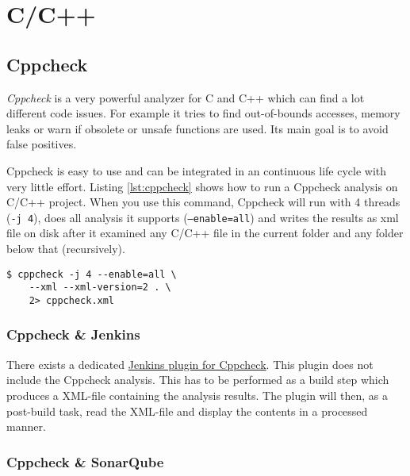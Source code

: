\section{C/C++}

\subsection{Cppcheck}
\textit{Cppcheck} is a very powerful analyzer for C and C++ which can find a lot different code issues. For example it tries to find out-of-bounds accesses, memory leaks or warn if obsolete or unsafe functions are used. Its main goal is to avoid false positives.

Cppcheck is easy to use and can be integrated in an continuous life cycle with very little effort.
Listing \ref{lst:cppcheck} shows how to run a Cppcheck analysis on C/C++ project. When you use this command, Cppcheck will run with 4 threads (\texttt{-j 4}), does all analysis it supports (\texttt{--enable=all}) and writes the results as xml file on disk after it examined any C/C++ file in the current folder and any folder below that (recursively).

\begin{lstlisting}[caption={Bash command to run Cppcheck},label={lst:cppcheck}]
$ cppcheck -j 4 --enable=all \
	--xml --xml-version=2 . \
	2> cppcheck.xml
\end{lstlisting}


\subsubsection{Cppcheck \& Jenkins}
There exists a dedicated \href{https://wiki.jenkins-ci.org/display/JENKINS/Cppcheck+Plugin}{Jenkins plugin for Cppcheck}. This plugin does not include the Cppcheck analysis. This has to be performed as a build step which produces a XML-file containing the analysis results. The plugin will then, as a post-build task, read the XML-file and display the contents in a processed manner.

\subsubsection{Cppcheck \& SonarQube}